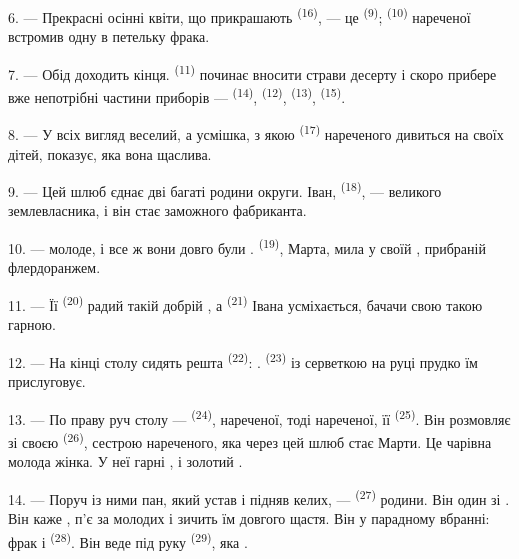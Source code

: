 6. --- Прекрасні осінні квіти, що прикрашають 
\textsuperscript{(16)}, --- це  \textsuperscript{(9)};
 \textsuperscript{(10)} нареченої встромив одну в петельку фрака.

7. --- Обід доходить кінця.  \textsuperscript{(11)} починає вносити
страви десерту і скоро прибере вже непотрібні частини приборів ---
 \textsuperscript{(14)},  \textsuperscript{(12)},
 \textsuperscript{(13)}, 
\textsuperscript{(15)}.

\VUsaut{3.0mm}

8. --- У всіх вигляд веселий, а усмішка, з якою 
\textsuperscript{(17)} нареченого дивиться на своїх дітей, показує, яка вона
щаслива.

9. --- Цей шлюб єднає дві багаті родини округи. Іван, 
\textsuperscript{(18)}, ---  великого землевласника, і він стає
 заможного фабриканта.

10. ---  молоде, і все ж вони довго були .
 \textsuperscript{(19)}, Марта, мила у своїй , прибраній флердоранжем.

11. --- Її  \textsuperscript{(20)} радий такій добрій
, а  \textsuperscript{(21)} Івана усміхається,
бачачи свою  такою гарною.

12. --- На кінці столу сидять решта  \textsuperscript{(22)}:
.  \textsuperscript{(23)} із
серветкою на руці прудко їм прислуговує.

\VUsaut{3.0mm}

13. --- По праву руч столу ---  \textsuperscript{(24)},
 нареченої, тоді  нареченої, її 
\textsuperscript{(25)}. Він розмовляє зі своєю 
\textsuperscript{(26)}, сестрою нареченого, яка через цей шлюб стає
 Марти. Це чарівна молода жінка. У неї гарні
,  і золотий .

14. --- Поруч із ними пан, який устав і підняв келих, --- 
\textsuperscript{(27)} родини. Він один зі . Він каже
, п'є за  молодих і зичить їм довгого щастя. Він у
парадному вбранні: фрак і  \textsuperscript{(28)}. Він
веде під руку  \textsuperscript{(29)}, яка .

